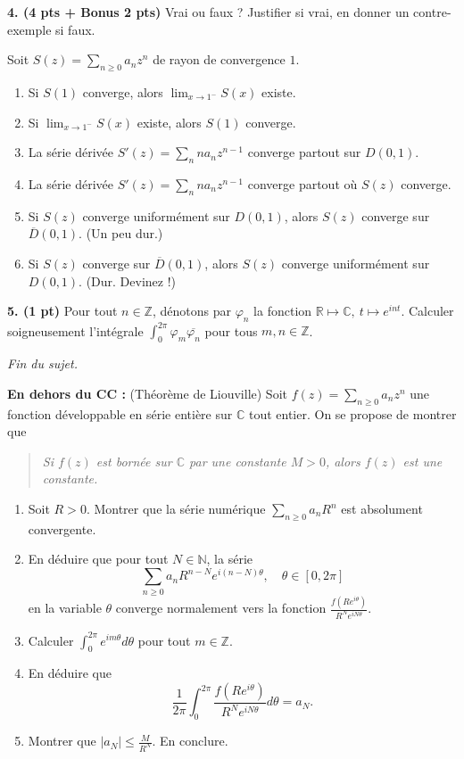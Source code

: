 \documentclass[a4paper,10pt]{article}
\newcommand{\N}{\mathbb{N}}
\newcommand{\Z}{\mathbb{Z}}
\newcommand{\R}{\mathbb{R}}
\newcommand{\C}{\mathbb{C}}
\newcommand{\abs}[1]{\left|#1\right|}
\begin{document}
\vspace{.1in}
\noindent
\textbf{4. (4 pts + Bonus 2 pts)}
Vrai ou faux ? Justifier si vrai, en donner un contre-exemple si faux.

Soit $S(z)=\sum_{n\geq0} a_nz^n$ de rayon de convergence $1$.
\begin{enumerate}[label=\alph*)]
    \item Si $S(1)$ converge, alors $\lim_{x\to 1^-}S(x)$ existe.
    \item Si $\lim_{x\to1^-}S(x)$ existe, alors $S(1)$ converge.
    \item La série dérivée $S'(z)=\sum_n na_nz^{n-1}$ converge partout sur $D(0,1)$.
    \item La série dérivée $S'(z)=\sum_n na_nz^{n-1}$ converge partout où $S(z)$ converge.
    \item Si $S(z)$ converge uniformément sur $D(0,1)$, alors $S(z)$ converge sur $\overline{D}(0,1)$. (Un peu dur.)
    \item Si $S(z)$ converge sur $\overline{D}(0,1)$, alors $S(z)$ converge uniformément sur $D(0,1)$. (Dur. Devinez !)
\end{enumerate}

\vspace{.1in}
\noindent
\textbf{5. (1 pt)}
Pour tout $n\in\Z$, dénotons par $\varphi_n$ la fonction $\R \mapsto \C,~t \mapsto e^{int}$.
Calculer soigneusement l'intégrale $\int_0^{2\pi}\varphi_m\overline{\varphi_n}$ pour tous $m,n\in\Z$.


\vspace{.3in}
\begin{center}
    \emph{Fin du sujet.}
\end{center}


\vspace{.4in}
\noindent
\textbf{En dehors du CC :} (Théorème de Liouville)
Soit $f(z)=\sum_{n\geq0}a_nz^n$ une fonction développable en série entière sur $\C$ tout entier. On se propose de montrer que 
\begin{quote}
    \textit{Si $f(z)$ est bornée sur $\C$ par une constante $M>0$, alors $f(z)$ est une constante.}
\end{quote}
\begin{enumerate}[label=\alph*)]
    \item Soit $R>0$. Montrer que la série numérique $\sum_{n\geq0} a_nR^n$ est absolument convergente. 
    \item En déduire que pour tout $N\in\N$, la série
    $$\sum_{n\geq0}a_nR^{n-N}e^{i(n-N)\theta},\quad \theta\in[0,2\pi]$$
    en la variable $\theta$ converge normalement vers la fonction $\frac{f(Re^{i\theta})}{R^Ne^{iN\theta}}$.
    \item Calculer $\int_0^{2\pi}e^{im\theta}d\theta$ pour tout $m\in\Z$.
    \item En déduire que 
    $$\frac{1}{2\pi}\int_0^{2\pi}\frac{f(Re^{i\theta})}{R^Ne^{iN\theta}}d\theta=a_N.$$
    \item Montrer que $\abs{a_N}\leq\frac{M}{R^N}$. En conclure. 
\end{enumerate}
\end{document}
